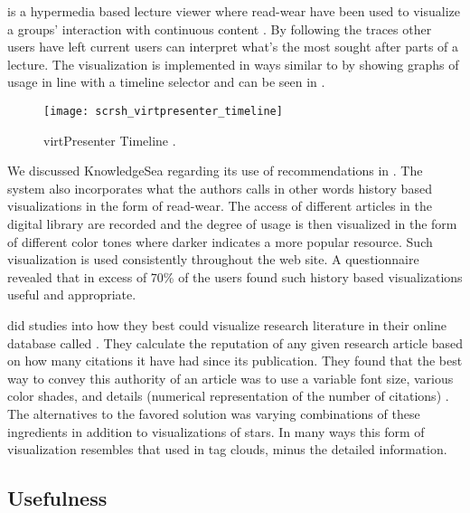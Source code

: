  is a hypermedia based lecture viewer where read-wear
have been used to visualize a groups' interaction with continuous content
\citep{mertens06}. By following the traces other users have left current users
can interpret what's the most sought after parts of a lecture. The
visualization is implemented in ways similar to \citet{hill92} by showing
graphs of usage in line with a timeline selector and can be seen in
.

\begin{figure}
  \centering
  \texttt{[image: scrsh\_virtpresenter\_timeline]}
  \caption[virtPresenter Timeline]{
    virtPresenter Timeline \citep[]{mertens06}.
  }
  \label{figure:scrsh.virtpresenter.timeline}
\end{figure}

We discussed KnowledgeSea regarding its use of recommendations in
.
The system also incorporates what the authors calls
\citep[]{brusilovsky05}\dash{}in other words history based
visualizations in the form of read-wear. The access of different articles in
the digital library are recorded and the degree of usage is then visualized in
the form of different color tones where darker indicates a more popular
resource. Such visualization is used consistently throughout the web site. A
questionnaire revealed that in excess of 70\%
\citeyearpar[p.15]{brusilovsky05} of the users
found such history based visualizations useful and appropriate.

\citet{pu03} did studies into how they best could visualize research
literature in their online database called . They calculate
the reputation of any given research article based on how many citations it
have had since its publication. They found that the best way to convey this
authority of an article was to use a variable font size, various color shades,
and details (numerical representation of the number of citations)
\citep[]{pu03}. The alternatives to the favored solution was varying
combinations of these ingredients in addition to visualizations of stars.
In many ways this form of visualization resembles that
used in tag clouds, minus the detailed information.

\subsection{Usefulness}

